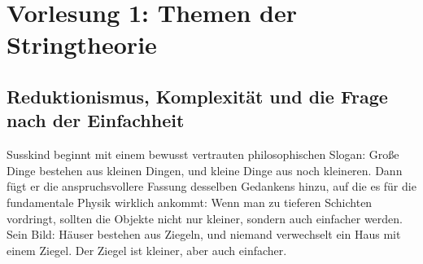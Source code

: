\chapter{Vorlesung 1: Themen der Stringtheorie}


\section{Reduktionismus, Komplexität und die Frage nach der Einfachheit}

Susskind beginnt mit einem bewusst vertrauten philosophischen Slogan: Große Dinge bestehen aus kleinen Dingen, und kleine Dinge aus noch kleineren. Dann fügt er die anspruchsvollere Fassung desselben Gedankens hinzu, auf die es für die fundamentale Physik wirklich ankommt: Wenn man zu tieferen Schichten vordringt, sollten die Objekte nicht nur kleiner, sondern auch einfacher werden. Sein Bild: Häuser bestehen aus Ziegeln, und niemand verwechselt ein Haus mit einem Ziegel. Der Ziegel ist kleiner, aber auch einfacher.


